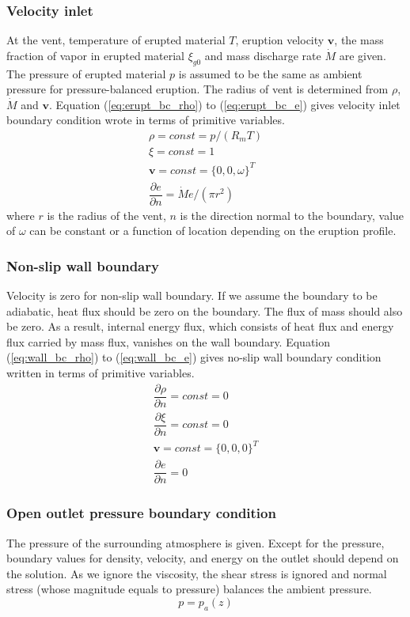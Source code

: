 \subsubsection{Velocity inlet}
At the vent, temperature of erupted material $T$, eruption velocity $\textbf{v}$, the mass fraction of vapor in erupted material $\xi_{g0}$ and mass discharge rate $\dot M$ are given. The pressure of erupted material $p$ is assumed to be the same as ambient pressure for pressure-balanced eruption. The radius of vent is determined from $\rho$, $\dot M$ and $\textbf{v}$. Equation (\ref{eq:erupt_bc_rho}) to (\ref{eq:erupt_bc_e}) gives velocity inlet boundary condition wrote in terms of primitive variables.
\begin{align}
\rho =const = p/\left(R_m T\right) \label{eq:erupt_bc_rho} \\
\xi=const=1 \label{eq:erupt_bc_xi}\\
\textbf{v} = const =\{0,0, \omega \}^T \label{eq:erupt_bc_v}\\
\dfrac{\partial e}{\partial n}=\dot M e /\left(\pi r^2\right) \label{eq:erupt_bc_e}
\end{align} 
where $r$ is the radius of the vent, $n$ is the direction normal to the boundary, value of $\omega$ can be constant or a function of location depending on the eruption profile.

\subsubsection{Non-slip wall boundary}
Velocity is zero for non-slip wall boundary. If we assume the boundary to be adiabatic, heat flux should be zero on the boundary. The flux of mass should also be zero. As a result, internal energy flux, which consists of heat flux and energy flux carried by mass flux, vanishes on the wall boundary. Equation (\ref{eq:wall_bc_rho}) to (\ref{eq:wall_bc_e}) gives no-slip wall boundary condition written in terms of primitive variables.
\begin{align}
\dfrac{\partial \rho}{\partial n} = const = 0\label{eq:wall_bc_rho} \\
\dfrac{\partial \xi}{\partial n} = const = 0 \label{eq:wall_bc_xi}\\ 
\textbf{v} = const =\{0,0,0\}^T \label{eq:wall_bc_v}\\
\dfrac{\partial e }{\partial n} = 0\label{eq:wall_bc_e}
\end{align} 

\subsubsection{Open outlet pressure boundary condition}
The pressure of the surrounding atmosphere is given. Except for the pressure, boundary values for density, velocity, and energy on the outlet should depend on the solution. As we ignore the viscosity, the shear stress is ignored and normal stress (whose magnitude equals to pressure) balances the ambient pressure.
\begin{equation}
p = p_a\left(z\right)  \label{eq:pressure_bc_p} 
\end{equation}

